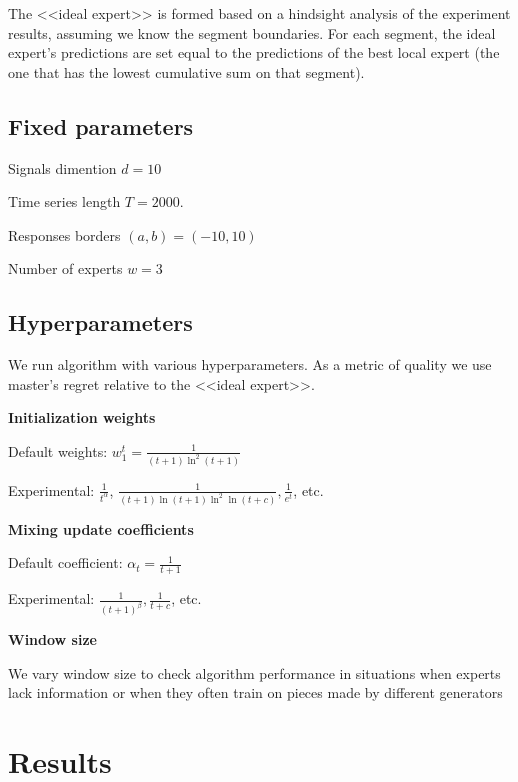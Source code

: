 \documentclass[12pt, twoside]{article}
\begin{document}
The <<ideal expert>> is formed based on a hindsight analysis of the experiment results, assuming we know the segment boundaries. For each segment, the ideal expert's predictions are set equal to the predictions of the best local expert (the one that has the lowest cumulative sum on that segment).
\newpage

\subsection{Fixed parameters}
Signals dimention $d=10$

Time series length $T = 2000$.

Responses borders $(a, b) = (-10, 10)$

Number of experts $w = 3$




\subsection{Hyperparameters}
We run algorithm with various hyperparameters. As a metric of quality we use master's regret relative to the <<ideal expert>>.

\textbf{Initialization weights}

\hspace*{3mm} Default weights: $w_1^t= \frac{1}{(t+1)\ln^2(t+1)}$

\hspace*{3mm} Experimental: $\frac{1}{t^\alpha}$, $\frac{1}{(t+1)\ln(t+1)\ln^2\ln(t+c)}, \frac{1}{e^t}$, etc.




\textbf{Mixing update coefficients}

\hspace*{3mm} Default coefficient: $\alpha_t = \frac{1}{t+1}$

\hspace*{3mm} Experimental:  $\frac{1}{(t+1)^\beta}, \frac{1}{t+c}$, etc.

\textbf{Window size}

\hspace*{3mm} We vary window size to check algorithm performance in situations when experts lack information or when they often train on pieces made by different generators

\section{Results}
\end{document}
